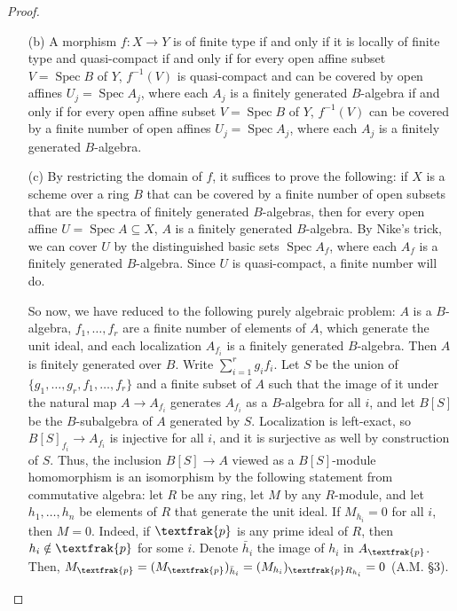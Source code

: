 \documentclass{article}
\newcommand{\goth}[1]{\textfrak{#1}}
\DeclareMathOperator{\spec}{Spec}
\begin{document}
\begin{enumerate} [label=\textbf{\arabic*.}, leftmargin=0em]
\begin{proof}
\begin{itemize} [leftmargin=0cm]
    \item[(b)] A morphism $f : X \to Y$ is of finite type if and only if it is locally of finite type and quasi-compact if and only if for every open affine subset $V = \spec{B}$ of $Y$, $f^{-1}(V)$ is quasi-compact and can be covered by open affines $U_j = \spec{A_j}$, where each $A_j$ is a finitely generated $B$-algebra if and only if for every open affine subset $V = \spec{B}$ of $Y$, $f^{-1}(V)$ can be covered by a finite number of open affines $U_j = \spec{A_j}$, where each $A_j$ is a finitely generated $B$-algebra.

    \item[(c)] By restricting the domain of $f$, it suffices to prove the following: if $X$ is a scheme over a ring $B$ that can be covered by a finite number of open subsets that are the spectra of finitely generated $B$-algebras, then for every open affine $U = \spec{A} \subseteq X$, $A$ is a finitely generated $B$-algebra. By Nike's trick, we can cover $U$ by the distinguished basic sets $\spec{A_f}$, where each $A_f$ is a finitely generated $B$-algebra. Since $U$ is quasi-compact, a finite number will do.
    
    So now, we have reduced to the following purely algebraic problem: $A$ is a $B$-algebra, $f_1, \dots, f_r$ are a finite number of elements of $A$, which generate the unit ideal, and each localization $A_{f_i}$ is a finitely generated $B$-algebra. Then $A$ is finitely generated over $B$. Write $\sum_{i = 1}^r g_i f_i$. Let $S$ be the union of $\{ g_1, \dots, g_r, f_1, \dots, f_r \}$ and a finite subset of $A$ such that the image of it under the natural map $A \to A_{f_i}$ generates $A_{f_i}$ as a $B$-algebra for all $i$, and let $B[S]$ be the $B$-subalgebra of $A$ generated by $S$. Localization is left-exact, so $B[S]_{f_i} \to A_{f_i}$ is injective for all $i$, and it is surjective as well by construction of $S$. Thus, the inclusion $B[S] \to A$ viewed as a $B[S]$-module homomorphism is an isomorphism by the following statement from commutative algebra: let $R$ be any ring, let $M$ by any $R$-module, and let $h_1, \dots, h_n$ be elements of $R$ that generate the unit ideal. If $M_{h_i} = 0$ for all $i$, then $M = 0$. Indeed, if $\goth{p}$ is any prime ideal of $R$, then $h_i \notin \goth{p}$ for some $i$. Denote $\bar{h}_i$ the image of $h_i$ in $A_\goth{p}$. Then, $M_{\goth{p}} = (M_\goth{p})_{\bar{h}_i} = (M_{h_i})_{\goth{p} R_{h_i}} = 0$ (A.M. \S 3).
\end{itemize}
\end{proof}


\end{enumerate}
\end{document}
